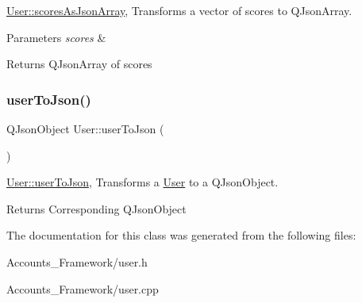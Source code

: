 \hyperlink{classUser_af14a1fba45613d9586d8951f13f9c4a0}{User\+::scores\+As\+Json\+Array}, Transforms a vector of scores to Q\+Json\+Array. 


\begin{DoxyParams}{Parameters}
{\em scores} & \\
\hline
\end{DoxyParams}
\begin{DoxyReturn}{Returns}
Q\+Json\+Array of scores 
\end{DoxyReturn}
\mbox{\label{classUser_a2edd9754d400f097b4aa88bc087ace8b}} 
\subsubsection{\texorpdfstring{user\+To\+Json()}{userToJson()}}
{\footnotesize\ttfamily Q\+Json\+Object User\+::user\+To\+Json (\begin{DoxyParamCaption}{ }\end{DoxyParamCaption})}



\hyperlink{classUser_a2edd9754d400f097b4aa88bc087ace8b}{User\+::user\+To\+Json}, Transforms a \hyperlink{classUser}{User} to a Q\+Json\+Object. 

\begin{DoxyReturn}{Returns}
Corresponding Q\+Json\+Object 
\end{DoxyReturn}


The documentation for this class was generated from the following files\+:\begin{DoxyCompactItemize}
\item 
Accounts\+\_\+\+Framework/user.\+h\item 
Accounts\+\_\+\+Framework/user.\+cpp\end{DoxyCompactItemize}

